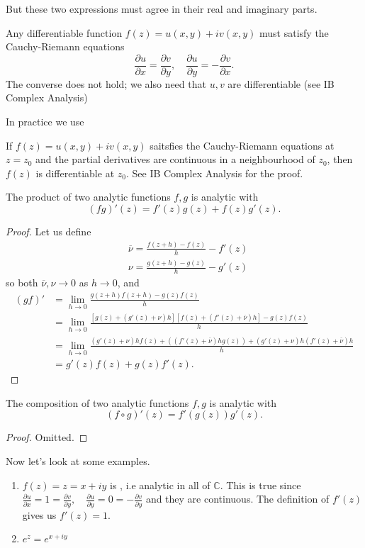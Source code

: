 \documentclass[a4paper]{scrartcl}
\begin{document}
But these two expressions must agree in their real and imaginary parts.
\begin{proposition}
      Any differentiable function $f (z)=u (x,y)+iv (x,y)$ must satisfy the Cauchy-Riemann equations \[
      \frac{\partial u}{\partial x}=\frac{\partial v}{\partial y}, \quad \frac{\partial u}{\partial y}= - \frac{\partial v}{\partial x}
      .\] The converse does not hold; we also need that $u,v$ are differentiable (see IB Complex Analysis)
\end{proposition}
In practice we use 
\begin{proposition}
      If $f (z)=u (x,y)+iv (x,y)$ saitsfies the Cauchy-Riemann equations at $z=z_0 $ and the partial derivatives are continuous in a neighbourhood of $z_0 $, then $f (z)$ is differentiable at $z_0 $. See IB Complex Analysis for the proof. 
\end{proposition}
\begin{proposition}
      The product of two analytic functions $f,g$ is analytic with \[
      (fg)' (z)=f' (z)g (z)+ f (z)g' (z)
      .\]
\end{proposition}
\begin{proof}
      Let us define 
      \begin{align*}
           &\overline{\nu} = \frac{f (z+h)-f (z)}{h}-f' (z)\\
           &\nu= \frac{g (z+h)-g (z)}{h}-g' (z)
      \end{align*}
      so both $\overline{\nu} ,\nu \rightarrow 0$ as $h \rightarrow 0$, and 
      \begin{align*}
           (gf)'&= \lim_{h \rightarrow 0} \frac{g (z+h)f (z+h)-g (z)f (z)}{h}\\
           &= \lim_{h \rightarrow 0} \frac{[g (z)+ (g' (z)+\nu)h][f (z)+(f' (z)+\overline{\nu} )h]-g (z)f (z)}{h}\\
           &= \lim_{h \rightarrow 0} \frac{(g' (z)+\nu)h f (z)+((f' (z)+\overline{\nu} )h g (z))+(g'(z)+\nu)h (f' (z)+\overline{\nu} )h     }{h}\\
           &=g' (z)f (z)+ g (z)f' (z).
      \end{align*}
\end{proof}
\begin{proposition}
      The composition of two analytic functions $f,g$ is analytic with \[
      (f \circ g)' (z)= f' (g (z)) g' (z)
      .\] 
\end{proposition}
\begin{proof}
      Omitted.
\end{proof}
\begin{example*}
     Now let's look at some examples. 
      \begin{enumerate}
           \item $f (z)=z=x+iy$ is , i.e analytic in all of $\mathbb{C}$. This is true since $\frac{\partial u}{\partial x}=1= \frac{\partial v}{\partial y}, \quad \frac{\partial u}{\partial y}=0 =- \frac{\partial v}{\partial y}$ and they are continuous. The definition of $f' (z)$ gives us $f' (z)=1$.
           \item $e^{z}=e^{x+iy}$ 
      \end{enumerate}
\end{example*}
\end{document}
